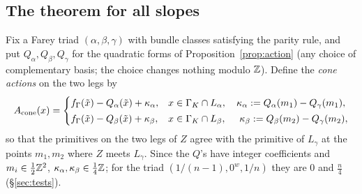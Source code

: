 \subsection{The theorem for all slopes}
Fix a Farey triad $(\alpha,\beta,\gamma)$ with bundle classes satisfying the parity rule, and put
$Q_\alpha,Q_\beta,Q_\gamma$ for the quadratic forms of Proposition~\ref{prop:action} (any choice of complementary
basis; the choice changes nothing modulo $\mathbb{Z}$).  Define the \emph{cone actions} on the two legs by
\[
A_{\rm cone}(x)=\begin{cases}
f_\Gamma(\tilde x)-Q_\alpha(\tilde x)+\kappa_\alpha, & x\in\Gamma_K\cap L_\alpha,\quad \kappa_\alpha:=Q_\alpha(m_1)-Q_\gamma(m_1),\\[2pt]
f_\Gamma(\tilde x)-Q_\beta(\tilde x)+\kappa_\beta, & x\in\Gamma_K\cap L_\beta,\quad\ \kappa_\beta:=Q_\beta(m_2)-Q_\gamma(m_2),
\end{cases}
\]
so that the primitives on the two legs of $Z$ agree with the primitive of $L_\gamma$ at the points $m_1,m_2$ where
$Z$ meets $L_\gamma$.  Since the $Q$'s have integer coefficients and $m_i\in\tfrac12\mathbb{Z}^2$, $\kappa_\alpha,\kappa_\beta\in\tfrac14\mathbb{Z}$;
for the triad $(1/(n-1),0^w,1/n)$ they are $0$ and $\tfrac n4$ (\S\ref{sec:tests}).

